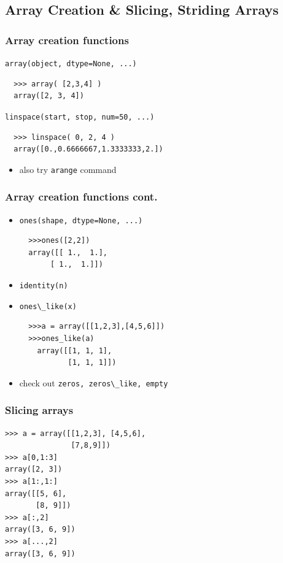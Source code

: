 \documentclass[14pt,compress]{beamer}
\newcommand{\typ}[1]{\lstinline{#1}}
\begin{document}
\subsection{Array Creation \& Slicing, Striding Arrays}
\begin{frame}[fragile]
  \frametitle{Array creation functions}
  \begin {block}{\typ{array(object, dtype=None, ...)}}
  \begin{lstlisting}
  >>> array( [2,3,4] )  
  array([2, 3, 4])
  \end{lstlisting}
  \end {block}
  \begin{block}{\typ{linspace(start, stop, num=50, ...)}}
  \begin{lstlisting}
  >>> linspace( 0, 2, 4 )   
  array([0.,0.6666667,1.3333333,2.])
  \end{lstlisting}
  \end{block}
  \begin{itemize}
  \item also try \typ{arange} command
  \end{itemize}
\end{frame}

\begin{frame}[fragile]
  \frametitle{Array creation functions cont.}
  \begin{itemize}  
  \item \typ{ones(shape, dtype=None, ...)}  
  \begin{lstlisting} 
  >>>ones([2,2])
  array([[ 1.,  1.],
       [ 1.,  1.]])
  \end{lstlisting}  
  \item \typ{identity(n)} 
  \item \typ{ones\_like(x)}  
  \begin{lstlisting} 
  >>>a = array([[1,2,3],[4,5,6]])
  >>>ones_like(a)
    array([[1, 1, 1],
           [1, 1, 1]])
  \end{lstlisting}
  \item check out \typ{zeros, zeros\_like, empty}
  \end{itemize}
\end{frame}

\begin{frame}[fragile]
  \frametitle{Slicing arrays}
\begin{lstlisting}
>>> a = array([[1,2,3], [4,5,6], 
               [7,8,9]])
>>> a[0,1:3]
array([2, 3])
>>> a[1:,1:]
array([[5, 6],
       [8, 9]])
>>> a[:,2]
array([3, 6, 9])
>>> a[...,2]
array([3, 6, 9])
\end{lstlisting}
\end{frame}
\end{document}
